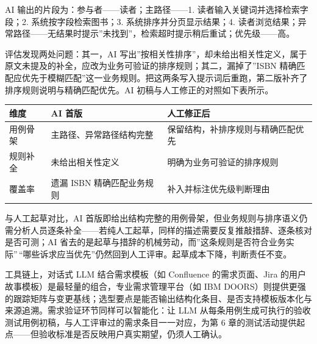 \documentclass[
]{ctexbook}
\newcounter{none}
\begin{document}
AI 输出的片段为：参与者------读者；主路径------1.
读者输入关键词并选择检索字段；2. 系统按字段检索图书；3.
系统排序并分页显示结果；4.
读者浏览结果；异常路径------无结果时提示''未找到''，检索超时提示稍后重试；优先级------高。

评估发现两处问题：其一，AI
写出''按相关性排序''，却未给出相关性定义，属于原文未提及的补全，应改为业务可验证的排序规则；其二，漏掉了''ISBN
精确匹配应优先于模糊匹配''这一业务规则。把这两条写入提示词后重跑，第二版补齐了排序规则说明与精确匹配优先。AI
初稿与人工修正的对照如下表所示。

{\def\LTcaptype{none} %
\begin{longtable}[]{@{}
  >{\raggedright\arraybackslash}p{}
  >{\raggedright\arraybackslash}p{}
  >{\raggedright\arraybackslash}p{}@{}}
\toprule\noalign{}
\begin{minipage}[b]{\linewidth}\raggedright
维度
\end{minipage} & \begin{minipage}[b]{\linewidth}\raggedright
AI 首版
\end{minipage} & \begin{minipage}[b]{\linewidth}\raggedright
人工修正后
\end{minipage} \\
\midrule\noalign{}
\endhead
\bottomrule\noalign{}
\endlastfoot
用例骨架 & 主路径、异常路径结构完整 &
保留结构，补排序规则与精确匹配优先 \\
规则补全 & 未给出相关性定义 & 明确为业务可验证的排序规则 \\
覆盖率 & 遗漏 ISBN 精确匹配业务规则 & 补入并标注优先级判断理由 \\
\end{longtable}
}

与人工起草对比，AI
首版即给出结构完整的用例骨架，但业务规则与排序语义仍需分析人员逐条补全------若纯人工起草，同样的描述需要反复推敲措辞、逐条核对是否可测；AI
省去的是起草与措辞的机械劳动，而''这条规则是否符合业务实际''\,``哪些诉求应当优先''仍然回到人工评审。起草成本下降，判断责任不变。

工具链上，对话式 LLM 结合需求模板（如 Confluence 的需求页面、Jira
的用户故事模板）是最轻量的组合，专业需求管理平台（如 IBM
DOORS）则提供更强的跟踪矩阵与变更基线；选型要点是能否输出结构化条目、是否支持模板版本化与来源追溯。需求验证环节同样可以智能化：让
LLM
从每条用例生成可执行的验收测试用例初稿，与人工评审过的需求条目一一对应，为第
6
章的测试活动提供起点------但验收标准是否反映用户真实期望，仍须人工确认。
\end{document}

